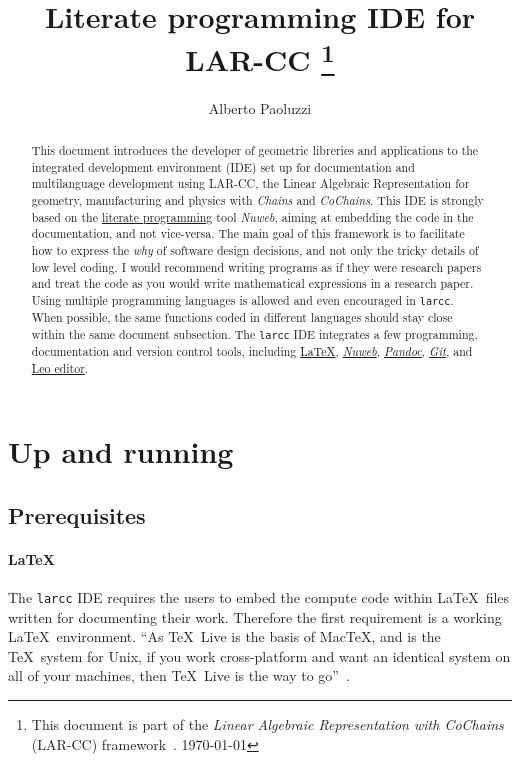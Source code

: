 \documentclass[11pt,oneside]{article}	%
\title{Literate programming IDE for LAR-CC 
\footnote{This document is part of the \emph{Linear Algebraic Representation with CoChains} (LAR-CC) framework~\cite{cclar-proj:2013:00}. \today}
}
\author{Alberto Paoluzzi}
\begin{document}
\maketitle

\begin{abstract}
This document introduces the developer of geometric libreries and applications to  the integrated development environment (IDE)  set up for documentation and multilanguage development  using LAR-CC, the Linear Algebraic Representation for geometry, manufacturing and physics with \emph{Chains} and \emph{CoChains}. This IDE is strongly based on the \href{http://www.literateprogramming.com/}{literate programming} tool \emph{Nuweb}, aiming at embedding the code in the documentation, and not vice-versa.
The main goal of this framework is to facilitate how to express the \emph{why} of software design decisions, and not only the tricky details of low level coding.  I would recommend writing programs as if they were research papers and treat the code as you would write mathematical expressions in a research paper. Using multiple programming languages is allowed and even encouraged in \texttt{larcc}. When possible, the same functions coded in different languages should stay close within the same document subsection. The \texttt{larcc} IDE integrates a few programming, documentation and version control tools, including \href{http://www.tug.org/texlive/}{\LaTeX}, \href{http://sourceforge.net/projects/nuweb/}{\emph{Nuweb}}, \href{http://johnmacfarlane.net/pandoc/}{\emph{Pandoc}},  \href{http://git-scm.com/}{\emph{Git}}, and \href{http://leoeditor.com/}{Leo editor}.
\end{abstract}

\tableofcontents
\section{Up and running}

\subsection{Prerequisites}

\paragraph{\LaTeX}
The \texttt{larcc} IDE requires the users to embed the compute code within \LaTeX\ files written for documenting their work. Therefore the first requirement is a working \LaTeX\ environment. ``As \TeX\ Live is the basis of Mac\TeX, and is the \TeX\ system for Unix, if you work cross-platform and want an identical system on all of your machines, then \TeX\ Live is the way to go''~\cite{miktek:2012}.
\end{document}
